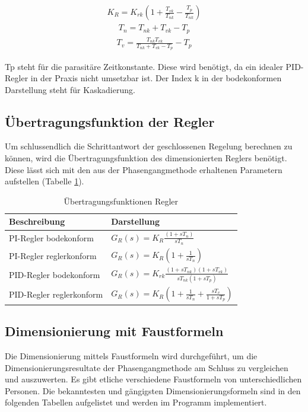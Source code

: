 \begin{align}
K_R=K_{rk}\left(1+\frac{T_{vk}}{T_{nk}}-\frac{T_p}{T_{nk}}\right)
\label{krherl}
\end{align}
\begin{align}
T_n=T_{nk}+T_{vk}-T_p
\label{tnherl}
\end{align}
\begin{align}
T_v=\frac{T_{nk}T_{vk}}{T_{nk}+T_{vk}-T_p}-T_p
\label{tvherl}
\end{align}\newline

Tp steht für die parasitäre Zeitkonstante. Diese wird benötigt, da ein idealer PID-Regler in der Praxis nicht umsetzbar ist. Der Index k in der bodekonformen Darstellung steht für Kaskadierung.

\subsection{Übertragungsfunktion der Regler}
Um schlussendlich die Schrittantwort der geschlossenen Regelung berechnen zu können, wird die Übertragungsfunktion des dimensionierten Reglers benötigt. Diese lässt sich mit den aus der Phasengangmethode erhaltenen Parametern aufstellen (Tabelle \ref{ufunkregler}).\newline
\begin{table}
\centering
\renewcommand*{\arraystretch}{1.7}
\begin{tabular}{|l|l|}
\hline 
\textbf{Beschreibung} & \textbf{Darstellung} \\ 
\hline
PI-Regler bodekonform & $G_R(s)=K_R\frac{(1+sT_n)}{sT_n}$ \\ 
\hline 
PI-Regler reglerkonform & $G_R(s)=K_R\left(1+\frac{1}{sT_n}\right)$ \\ 
\hline 
PID-Regler bodekonform & $G_R(s)=K_{rk}\frac{(1+sT_{nk})(1+sT_{vk})}{sT_{nk}(1+sT_p)}$ \\ 
\hline 
PID-Regler reglerkonform & $G_R(s)=K_R\left(1+\frac{1}{sT_n}+\frac{sT_v}{1+sT_p}\right)$ \\ 
\hline 
\end{tabular} 
\renewcommand*{\arraystretch}{1}
\caption{Übertragungsfunktionen Regler \cite{zellwegerregel}}
\label{ufunkregler}
\end{table}

\newpage
\subsection{Dimensionierung mit Faustformeln}
Die Dimensionierung mittels Faustformeln wird durchgeführt, um die Dimensionierungsresultate der Phasengangmethode am Schluss zu vergleichen und auszuwerten. Es gibt etliche verschiedene Faustformeln von unterschiedlichen Personen. Die bekanntesten und gängigsten Dimensionierungsformeln sind in den folgenden Tabellen aufgelistet und werden im Programm implementiert.\\

